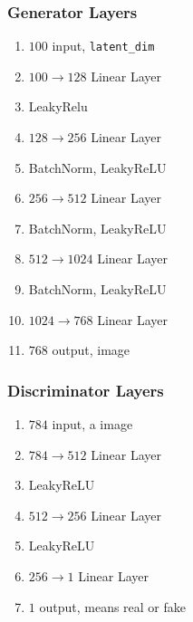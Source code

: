 \subsubsection{Generator Layers}

\begin{enumerate}
  \item $100$ input, \texttt{latent\_dim}
  \item $100 \to 128 $ Linear Layer
  \item LeakyRelu
  \item $128 \to 256 $ Linear Layer
  \item BatchNorm, LeakyReLU
  \item $256 \to 512 $ Linear Layer
  \item BatchNorm, LeakyReLU
  \item $512 \to 1024$ Linear Layer
  \item BatchNorm, LeakyReLU
  \item $1024 \to 768$ Linear Layer
  \item $768$ output, image
\end{enumerate}

\subsubsection{Discriminator Layers}

\begin{enumerate}
  \item $784$ input, a image
  \item $784 \to 512 $ Linear Layer
  \item LeakyReLU
  \item $512 \to 256 $ Linear Layer
  \item LeakyReLU
  \item $256 \to 1 $ Linear Layer
  \item $1$ output, means real or fake
\end{enumerate}
